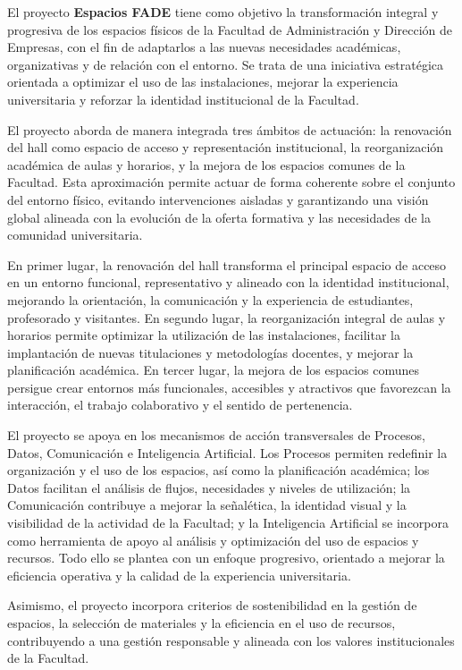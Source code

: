 \documentclass[11pt,a4paper]{scrreprt}
\begin{document}
\small
El proyecto \textbf{Espacios FADE} tiene como objetivo la transformación integral y progresiva de los espacios físicos de la Facultad de Administración y Dirección de Empresas, con el fin de adaptarlos a las nuevas necesidades académicas, organizativas y de relación con el entorno. Se trata de una iniciativa estratégica orientada a optimizar el uso de las instalaciones, mejorar la experiencia universitaria y reforzar la identidad institucional de la Facultad.

El proyecto aborda de manera integrada tres ámbitos de actuación: la renovación del hall como espacio de acceso y representación institucional, la reorganización académica de aulas y horarios, y la mejora de los espacios comunes de la Facultad. Esta aproximación permite actuar de forma coherente sobre el conjunto del entorno físico, evitando intervenciones aisladas y garantizando una visión global alineada con la evolución de la oferta formativa y las necesidades de la comunidad universitaria.

En primer lugar, la renovación del hall transforma el principal espacio de acceso en un entorno funcional, representativo y alineado con la identidad institucional, mejorando la orientación, la comunicación y la experiencia de estudiantes, profesorado y visitantes. En segundo lugar, la reorganización integral de aulas y horarios permite optimizar la utilización de las instalaciones, facilitar la implantación de nuevas titulaciones y metodologías docentes, y mejorar la planificación académica. En tercer lugar, la mejora de los espacios comunes persigue crear entornos más funcionales, accesibles y atractivos que favorezcan la interacción, el trabajo colaborativo y el sentido de pertenencia.

El proyecto se apoya en los mecanismos de acción transversales de Procesos, Datos, Comunicación e Inteligencia Artificial. Los Procesos permiten redefinir la organización y el uso de los espacios, así como la planificación académica; los Datos facilitan el análisis de flujos, necesidades y niveles de utilización; la Comunicación contribuye a mejorar la señalética, la identidad visual y la visibilidad de la actividad de la Facultad; y la Inteligencia Artificial se incorpora como herramienta de apoyo al análisis y optimización del uso de espacios y recursos. Todo ello se plantea con un enfoque progresivo, orientado a mejorar la eficiencia operativa y la calidad de la experiencia universitaria.

Asimismo, el proyecto incorpora criterios de sostenibilidad en la gestión de espacios, la selección de materiales y la eficiencia en el uso de recursos, contribuyendo a una gestión responsable y alineada con los valores institucionales de la Facultad.
\end{document}
